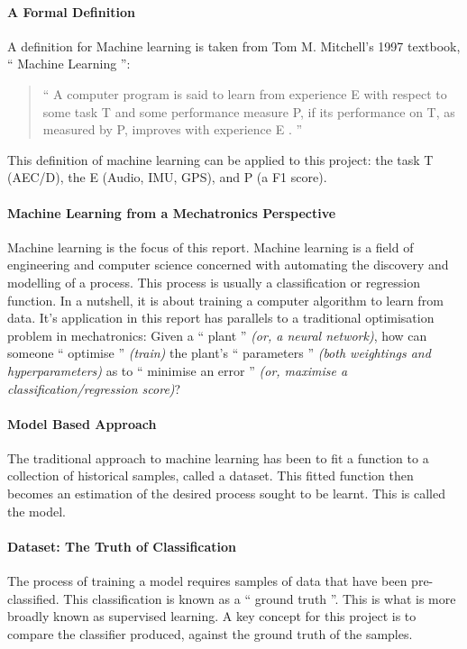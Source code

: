 \documentclass{UoNMCHA}
\newcommand{\inlineQuote}[1]{`` #1 ''}
\newcommand{\fancyquote}[1]{\begin{quotation}\inlineQuote{#1}\end{quotation}}
\numberwithin{equation}{section}
\begin{document}
\paragraph{A Formal Definition}
A definition for Machine learning is taken from Tom M. Mitchell's 1997 textbook, \inlineQuote{Machine Learning}:
\fancyquote{A computer program is said to learn from experience E with respect to some task T and some performance measure P, if its performance on T, as measured by P, improves with experience E \cite{Mitchell1997}.}

This definition of machine learning can be applied to this project: the task T (AEC/D), the E (Audio, IMU, GPS), and P (a F1 score). 

\paragraph{Machine Learning from a Mechatronics Perspective}
Machine learning is the focus of this report. Machine learning is a field of engineering and computer science concerned with automating the discovery and modelling of a process. This process is usually a classification or regression function. In a nutshell, it is about training a computer algorithm to learn from data.
It's application in this report has parallels to a traditional optimisation problem in mechatronics: Given a \inlineQuote{plant} {\itshape(or, a neural network)}, how can someone \inlineQuote{optimise} {\itshape(train)} the plant's \inlineQuote{parameters} {\itshape(both weightings and hyperparameters)} as to \inlineQuote{minimise an error} {\itshape(or, maximise a classification/regression score)}?

\paragraph{Model Based Approach}
The traditional approach to machine learning has been to fit a function to a collection of historical samples, called a dataset. This fitted function then becomes an estimation of the desired process sought to be learnt. This is called the model. 

\paragraph{Dataset: The Truth of Classification}
The process of training a model requires samples of data that have been pre-classified. This classification is known as a \inlineQuote{ground truth}. This is what is more broadly known as supervised learning. A key concept for this project is to compare the classifier produced, against the ground truth of the samples.
\end{document}
